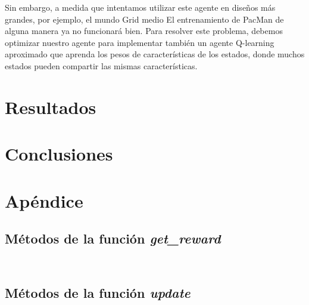 \documentclass[11pt]{exam}
\begin{document}
Sin embargo, a medida que intentamos utilizar este agente en diseños más grandes, por ejemplo, el mundo Grid medio
El entrenamiento de PacMan de alguna manera ya no funcionará bien. Para resolver este problema, debemos
optimizar nuestro agente para implementar también un agente Q-learning aproximado que aprenda los pesos de
características de los estados, donde muchos estados pueden compartir las mismas características.

\section{Resultados}\label{resultados}

\section{Conclusiones}\label{conclusiones}

\section{Apéndice}\label{apendice}

\subsection{Métodos de la función \textit{get\_reward}}

\begin{lstlisting}[language=python, basicstyle=\footnotesize]
	
\end{lstlisting}

\subsection{Métodos de la función \textit{update}}

\begin{lstlisting}[language=python, basicstyle=\footnotesize]
	
\end{lstlisting}
\end{document}

